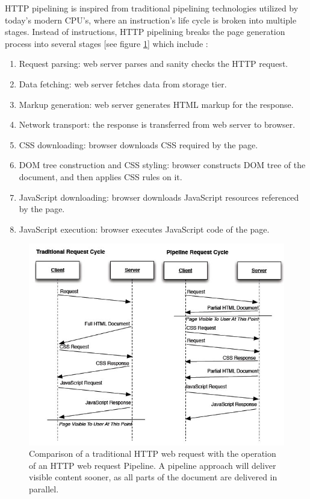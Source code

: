 \documentclass[12pt]{report}
\begin{document}
HTTP pipelining is inspired from traditional pipelining technologies utilized by today’s modern CPU's, where an instruction's life cycle is broken into multiple stages. Instead of instructions, HTTP pipelining breaks the page generation process into several stages [see figure \ref{fig:HTTPRequestCycles}] which include \cite{facebookBigpipe}:

\begin{enumerate}
  \item Request parsing: web server parses and sanity checks the HTTP request. 
  \item Data fetching: web server fetches data from storage tier.
  \item Markup generation: web server generates HTML markup for the response. 
  \item Network transport: the response is transferred from web server to browser.
  \item CSS downloading: browser downloads CSS required by the page. 
  \item DOM tree construction and CSS styling: browser constructs DOM tree of the document, and then applies CSS rules on it.
  \item JavaScript downloading: browser downloads JavaScript resources referenced by the page.
  \item JavaScript execution: browser executes JavaScript code of the page.
\end{enumerate}

\begin{figure}[H]
\label{fig:HTTPRequestCycles}
\centering
\includegraphics[width=145mm]{figures/images/HTTP_request_cycles.jpg}
\caption{Comparison of a traditional HTTP web request with the operation of an HTTP web request Pipeline. A pipeline approach will deliver visible content sooner, as all parts of the  document are delivered in parallel.}
\end{figure}
\end{document}
